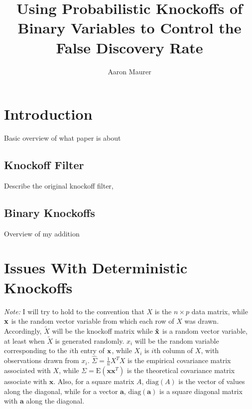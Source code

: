 \documentclass[11pt]{article}
\newcommand{\E}{\mathrm{E}}
\newcommand{\diag}{\mathrm{diag}}
\theoremstyle{definition}
\begin{document}
\title{Using Probabilistic Knockoffs of Binary Variables to Control the False Discovery Rate}
\author{Aaron Maurer}
\maketitle
\section{Introduction}
    Basic overview of what paper is about
    
\subsection{Knockoff Filter}
    Describe the original knockoff filter, 

\subsection{Binary Knockoffs}
    Overview of my addition

\section{Issues With Deterministic Knockoffs} 
    {\em Note:} I will try to hold to the convention that $X$ is the $n\times p$ data matrix, while $\bf x$ is the random vector variable from which each row of $X$ was drawn. Accordingly, $\tilde X$ will be the knockoff matrix while $\bf \tilde x$ is a random vector variable, at least when $\tilde X$ is generated randomly. $x_i$ will be the random variable corresponding to the $i$th entry of $\bf x$, while $X_i$ is $i$th column of $X$, with observations drawn from $x_i$. $\hat \Sigma = \frac{1}{n}X^TX$ is the empirical covariance matrix associated with $X$, while $\Sigma=\E(\mathbf x \mathbf x^T)$ is the theoretical covariance matrix associate with $\mathbf x$. Also, for a square matrix $A$, $\diag(A)$ is the vector of values along the diagonal, while for a vector $\mathbf a$, $\diag(\mathbf a)$ is a square diagonal matrix with $\mathbf a$ along the diagonal.\\
\end{document}
